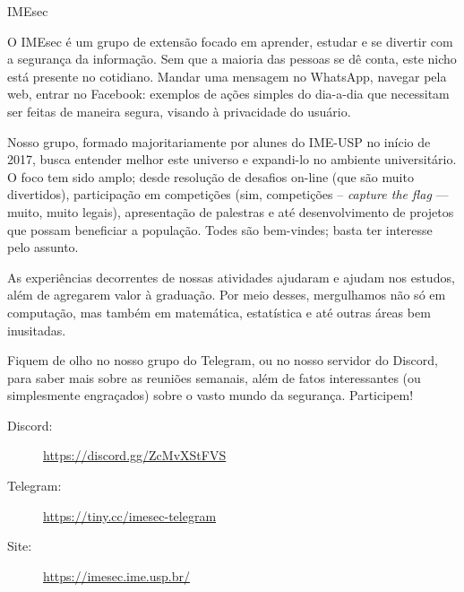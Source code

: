 \begin{subsecao}{IMEsec}


O IMEsec é um grupo de extensão focado em aprender, estudar e se divertir com a
segurança da informação. Sem que a maioria das pessoas se dê conta, este nicho
está presente no cotidiano. Mandar uma mensagem no WhatsApp, navegar pela web,
entrar no Facebook: exemplos de ações simples do dia-a-dia que necessitam ser
feitas de maneira segura, visando à privacidade do usuário.

Nosso grupo, formado majoritariamente por alunes do IME-USP no início de 2017,
busca entender melhor este universo e expandi-lo no ambiente universitário. O
foco tem sido amplo; desde resolução de desafios on-line (que são muito
divertidos), participação em competições (sim, competições -- \textit{capture the
flag} — muito, muito legais), apresentação de palestras e até desenvolvimento de
projetos que possam beneficiar a população. Todes são bem-vindes; basta ter
interesse pelo assunto.

As experiências decorrentes de nossas atividades ajudaram e ajudam nos estudos,
além de agregarem valor à graduação. Por meio desses, mergulhamos não só em
computação, mas também em matemática, estatística e até outras áreas bem
inusitadas.

Fiquem de olho no nosso grupo do Telegram, ou no nosso servidor do Discord, 
para saber mais sobre as reuniões semanais, além de fatos interessantes (ou 
simplesmente engraçados) sobre o vasto mundo da segurança. Participem!

\begin{description}
  \item[Discord:] \url{https://discord.gg/ZcMvXStFVS}
  \item[Telegram:] \url{https://tiny.cc/imesec-telegram}
  \item[Site:] \url{https://imesec.ime.usp.br/}
\end{description}

\end{subsecao}
